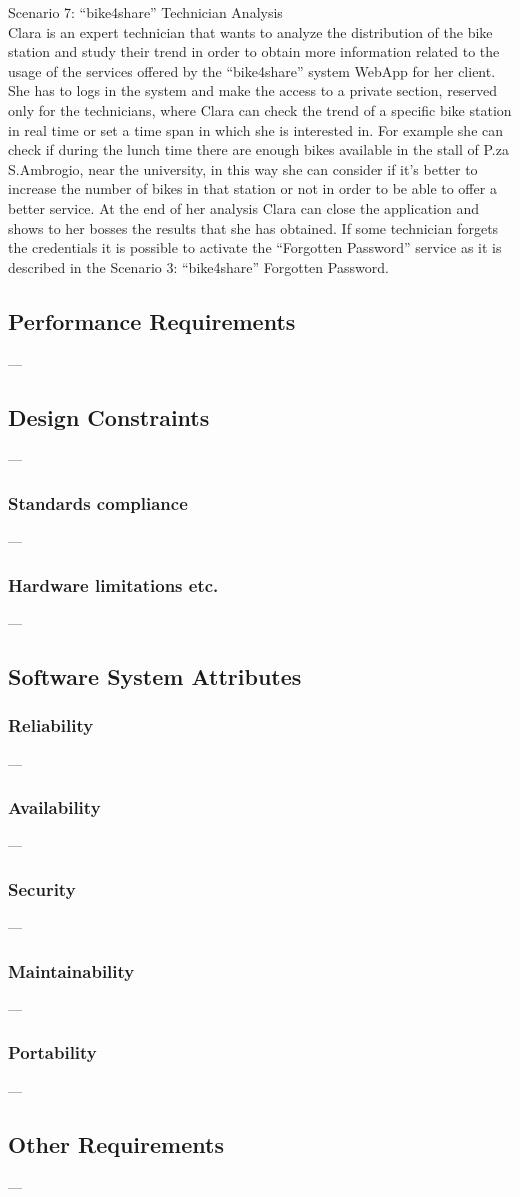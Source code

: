 \documentclass{article}
\begin{document}
Scenario 7: “bike4share” Technician Analysis \\
Clara is an expert technician that wants to analyze the distribution of the bike station and study their trend in order to obtain more information related to the usage of the services offered by the “bike4share” system WebApp for her client.
She has to logs in the system and make the access to a private section, reserved only for the technicians, where Clara can check the trend of a specific bike station in real time or set a time span in which she is interested in. For example she can check if during the lunch time there are enough bikes available in the stall of P.za S.Ambrogio, near the university, in this way she can consider if it’s better to increase the number of bikes in that station or not in order to be able to offer a better service.
At the end of her analysis Clara can close the application and shows to her bosses the results that she has obtained.
If some technician forgets the credentials it is possible to activate the “Forgotten Password” service as it is described in the Scenario 3: “bike4share” Forgotten Password.

\subsection{Performance Requirements}
---
\subsection{Design Constraints}
---
\subsubsection{Standards compliance} 
---
\subsubsection{Hardware limitations etc.}
---
\subsection{Software System Attributes}
\subsubsection{Reliability}
---
\subsubsection{Availability} 
---
\subsubsection{Security}
---
\subsubsection{Maintainability}
---
\subsubsection{Portability}
---
\subsection{Other Requirements}
---
\end{document}
